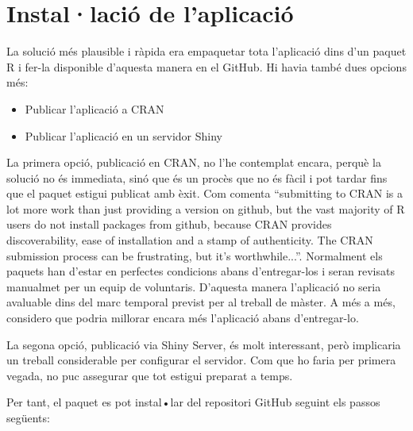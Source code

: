 \section{Instal·lació de l'aplicació}

La solució més plausible i ràpida era empaquetar tota l'aplicació dins d'un paquet R i fer-la disponible d'aquesta manera en el GitHub. Hi havia també dues opcions més: 

\begin{itemize}
\item Publicar l'aplicació a CRAN
\item Publicar l'aplicació en un servidor Shiny
\end{itemize}
La primera opció, publicació en CRAN, no l’he contemplat encara, perquè la solució no és immediata, sinó que és un procès que no és fàcil i pot tardar fins que el paquet estigui
publicat amb èxit. Com comenta \cite{HWick} \enquote{submitting to CRAN is a lot more work than just providing a version on github, but the vast majority of R users do not install packages from github, because CRAN provides discoverability, ease of installation and a stamp of authenticity. The CRAN submission process can be frustrating, but it’s worthwhile...}. Normalment els paquets han d’estar en perfectes condicions abans d'entregar-los i seran revisats manualmet per un equip de voluntaris. D'aquesta manera l'aplicació no seria avaluable dins del marc temporal previst per al treball de màster. A més a més, considero que podria millorar encara més l'aplicació abans d'entregar-lo.

La segona opció, publicació via Shiny Server, és molt interessant, però implicaria un treball considerable per configurar el servidor. Com que ho faria per primera vegada, no puc assegurar que tot estigui preparat a temps. 

Per tant, el paquet  es pot instal•lar del repositori GitHub seguint els passos següents:

